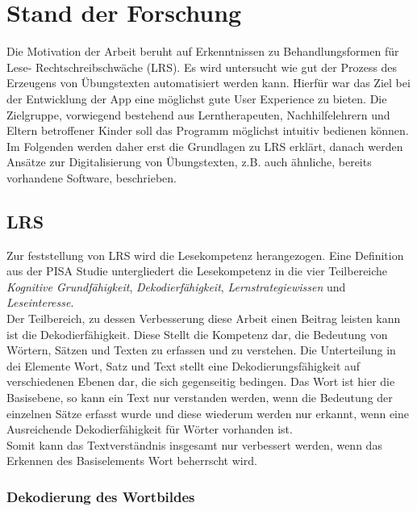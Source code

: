 
\chapter{Stand der Forschung}

Die Motivation der Arbeit beruht auf Erkenntnissen zu Behandlungsformen für Lese- Rechtschreibschwäche (LRS). Es wird untersucht wie gut der Prozess des Erzeugens von Übungstexten automatisiert werden kann. Hierfür war das Ziel bei der Entwicklung der App eine möglichst gute User Experience zu bieten. Die Zielgruppe, vorwiegend bestehend aus Lerntherapeuten, Nachhilfelehrern und Eltern betroffener Kinder soll das Programm möglichst intuitiv bedienen können.\\
Im Folgenden werden daher erst die Grundlagen zu LRS erklärt, danach werden Ansätze zur Digitalisierung von Übungstexten, z.B. auch ähnliche, bereits vorhandene Software, beschrieben.

\section{LRS}

Zur feststellung von LRS wird die Lesekompetenz herangezogen. Eine Definition aus der PISA Studie  untergliedert die Lesekompetenz in die vier Teilbereiche \textit{Kognitive Grundfähigkeit}, \textit{Dekodierfähigkeit}, \textit{Lernstrategiewissen} und \textit{Leseinteresse}.\\
Der Teilbereich, zu dessen Verbesserung diese Arbeit einen Beitrag leisten kann ist die Dekodierfähigkeit. Diese Stellt die Kompetenz dar, die Bedeutung von Wörtern, Sätzen und Texten zu erfassen und zu verstehen. Die Unterteilung in dei Elemente Wort, Satz und Text stellt eine Dekodierungsfähigkeit auf verschiedenen Ebenen dar, die sich gegenseitig bedingen. Das Wort ist hier die Basisebene, so kann ein Text nur verstanden werden, wenn die Bedeutung der einzelnen Sätze erfasst wurde und diese wiederum werden nur erkannt, wenn eine Ausreichende Dekodierfähigkeit für Wörter vorhanden ist.\\
Somit kann das Textverständnis insgesamt nur verbessert werden, wenn das Erkennen des Basiselements Wort beherrscht wird.

\subsection{Dekodierung des Wortbildes}

